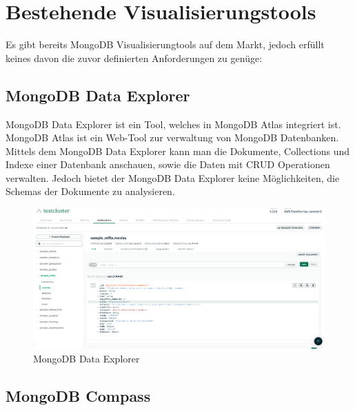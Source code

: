 \section{Bestehende Visualisierungstools}
\label{sec:bestehende_visualisierungstools}

Es gibt bereits MongoDB Visualisierungtools auf dem Markt, jedoch erfüllt keines davon die zuvor definierten Anforderungen zu genüge:

\subsection{MongoDB Data Explorer}
\label{sub:mongodb_data_explorer}

MongoDB Data Explorer ist ein Tool, welches in MongoDB Atlas integriert ist.
MongoDB Atlas ist ein Web-Tool zur verwaltung von MongoDB Datenbanken.
Mittels dem MongoDB Data Explorer kann man die Dokumente, Collections und Indexe einer Datenbank anschauen, sowie die Daten mit CRUD Operationen verwalten.
Jedoch bietet der MongoDB Data Explorer keine Möglichkeiten, die Schemas der Dokumente zu analysieren.
\begin{figure}[H]
    \includegraphics[width=\textwidth]{images/mongodb_data_explorer}
    \caption{MongoDB Data Explorer}
    \label{fig:mongodb_data_explorer}
\end{figure}

\subsection{MongoDB Compass}
\label{sub:mongodb_compass}

